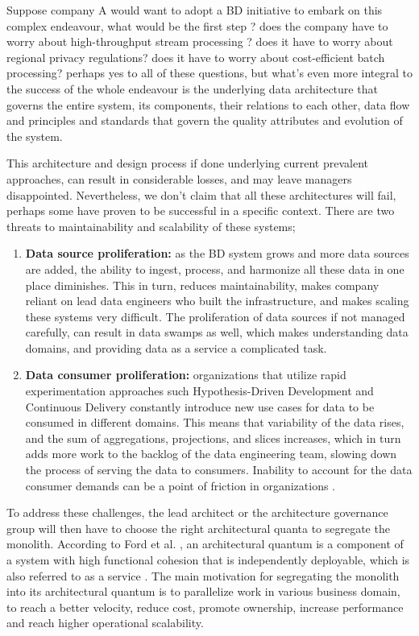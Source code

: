 \documentclass[review]{elsarticle}
\begin{document}
Suppose company A would want to adopt a BD initiative to embark on this complex endeavour, what would be the first step ? does the company have to worry about high-throughput stream processing ? does it have to worry about regional privacy regulations? does it have to worry about cost-efficient batch processing? perhaps yes to all of these questions, but what's even more integral to the success of the whole endeavour is the underlying data architecture that governs the entire system, its components, their relations to each other, data flow and principles and standards that govern the quality attributes and evolution of the system.

This architecture and design process if done underlying current prevalent approaches, can result in considerable losses, and may leave managers disappointed. Nevertheless, we don't claim that all these architectures will fail, perhaps some have proven to be successful in a specific context. There are two threats to maintainability and scalability of these systems;

\begin{enumerate}
    \item \textbf{Data source proliferation:} as the BD system grows and more data sources are added, the ability to ingest, process, and harmonize all these data in one place diminishes. This in turn, reduces maintainability, makes company reliant on lead data engineers who built the infrastructure, and makes scaling these systems very difficult. The proliferation of data sources if not managed carefully, can result in data swamps as well, which makes understanding data domains, and providing data as a service a complicated task.
    \item \textbf{Data consumer proliferation:} organizations that utilize rapid experimentation approaches such Hypothesis-Driven Development and Continuous Delivery \cite{hypothesisDev} constantly introduce new use cases for data to be consumed in different domains. This means that variability of the data rises, and the sum of aggregations, projections, and slices increases, which in turn adds more work to the backlog of the data engineering team, slowing down the process of serving the data to consumers. Inability to account for the data consumer demands can be a point of friction in organizations \cite{monolithToMesh}. 
\end{enumerate}

To address these challenges, the lead architect or the architecture governance group will then have to choose the right architectural quanta to segregate the monolith. According to Ford et al. \cite{ford2017building}, an architectural quantum is a component of a system with high functional cohesion that is independently deployable, which is also referred to as a service \cite{newman2021building}. The main motivation for segregating the monolith into its architectural quantum is to parallelize work in various business domain, to reach a better velocity, reduce cost, promote ownership, increase performance and reach higher operational scalability.
\end{document}
